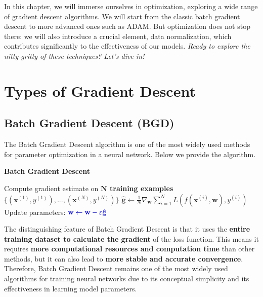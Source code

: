 \vspace{-0.4cm}
In this chapter, we will immerse ourselves in optimization, exploring a wide range of gradient descent algorithms. We will start from the classic batch gradient descent to more advanced ones such as ADAM. But optimization does not stop there: we will also introduce a crucial element, data normalization, which contributes significantly to the effectiveness of our models. \textit{Ready to explore the nitty-gritty of these techniques? Let's dive in!}
\vspace{-0.4cm}

\section{Types of Gradient Descent}

\subsection{Batch Gradient Descent (BGD)}

The Batch Gradient Descent algorithm is one of the most widely used methods for parameter optimization in a neural network. Below we provide the algorithm.

\begin{algorithm}
\renewcommand\thealgorithm{}
\caption{\textbf{\textcolor{mygreen}{Batch Gradient Descent}}}
\begin{algorithmic}[1]
    \STATE Compute gradient estimate on \textbf{\textcolor{myred}{$\mathbf{N}$ training examples}} $\{ (\mathbf{x}^{(1)}, y^{(1)}), ..., (\mathbf{x}^{(N)}, y^{(N)}) \}$
    \STATE $
    \mathbf{\hat{g}} \leftarrow \frac{1}{N}\nabla_{\mathbf{w}} \sum_{i=1}^{N} L(f(\mathbf{x}^{(i)},\mathbf{w}), y^{(i)})
    $
    \STATE Update parameters:
    $
    \textcolor{mybluee}{\mathbf{w} \leftarrow \mathbf{w} - \varepsilon \mathbf{\hat{g}}} 
    $
\ENDWHILE
\end{algorithmic}
\end{algorithm}

The distinguishing feature of Batch Gradient Descent is that it uses the \textbf{\textcolor{myred}{entire training dataset to calculate the gradient}} of the loss function. This means it requires \textbf{more computational resources and computation time} than other methods, but it can also lead to \textbf{more stable and accurate convergence}.
Therefore, Batch Gradient Descent remains one of the most widely used algorithms for training neural networks due to its conceptual simplicity and its effectiveness in learning model parameters. 

